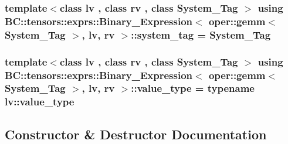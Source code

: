 \subsubsection[{\texorpdfstring{system\+\_\+tag}{system_tag}}]{\setlength{\rightskip}{0pt plus 5cm}template$<$class lv , class rv , class System\+\_\+\+Tag $>$ using {\bf B\+C\+::tensors\+::exprs\+::\+Binary\+\_\+\+Expression}$<$ {\bf oper\+::gemm}$<$ System\+\_\+\+Tag $>$, lv, rv $>$\+::{\bf system\+\_\+tag} =  System\+\_\+\+Tag}\hypertarget{structBC_1_1tensors_1_1exprs_1_1Binary__Expression_3_01oper_1_1gemm_3_01System__Tag_01_4_00_01lv_00_01rv_01_4_acb8bcec11c350fe4c36d899f3d1f5fbe}{}\label{structBC_1_1tensors_1_1exprs_1_1Binary__Expression_3_01oper_1_1gemm_3_01System__Tag_01_4_00_01lv_00_01rv_01_4_acb8bcec11c350fe4c36d899f3d1f5fbe}
\subsubsection[{\texorpdfstring{value\+\_\+type}{value_type}}]{\setlength{\rightskip}{0pt plus 5cm}template$<$class lv , class rv , class System\+\_\+\+Tag $>$ using {\bf B\+C\+::tensors\+::exprs\+::\+Binary\+\_\+\+Expression}$<$ {\bf oper\+::gemm}$<$ System\+\_\+\+Tag $>$, lv, rv $>$\+::{\bf value\+\_\+type} =  typename lv\+::value\+\_\+type}\hypertarget{structBC_1_1tensors_1_1exprs_1_1Binary__Expression_3_01oper_1_1gemm_3_01System__Tag_01_4_00_01lv_00_01rv_01_4_a2e81a6a9d5c6ea6f79b09597e3130ead}{}\label{structBC_1_1tensors_1_1exprs_1_1Binary__Expression_3_01oper_1_1gemm_3_01System__Tag_01_4_00_01lv_00_01rv_01_4_a2e81a6a9d5c6ea6f79b09597e3130ead}


\subsection{Constructor \& Destructor Documentation}
